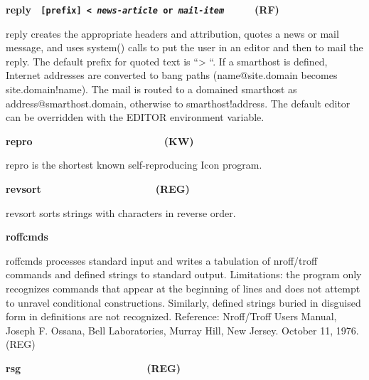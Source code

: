 {\sffamily\bfseries
reply \ \texttt{\textmd{[prefix] {\textless}
}}\texttt{\textmd{\textit{news-article}}}\texttt{\textmd{ or
}}\texttt{\textmd{\textit{mail-item\ \ \ \ \ \  }}}(RF)}

\textsf{reply} creates the appropriate headers and attribution, quotes a
news or mail message, and uses \textsf{system()} calls to put the user
in an editor and then to mail the reply. The default
prefix for quoted text is \textsf{{\textquotedblleft}{\textgreater}
{\textquotedblleft}}. If a smarthost is defined, Internet addresses are
converted to bang paths (\textsf{name@site.domain} becomes
\textsf{site.domain!name}). The mail is routed to a domained smarthost
as \textsf{address@smarthost.domain}, otherwise to
\textsf{smarthost!address}. The default editor can be overridden with
the EDITOR environment variable. 

{\sffamily\bfseries
repro\ \ \ \ \ \ \ \ \ \ \ \ \ \ \ \ \ \ \ \ \ \  \ (KW)}

\textsf{repro} is the shortest known self-reproducing Icon program. 

{\sffamily\bfseries
revsort\ \ \ \ \ \ \ \ \ \ \ \ \ \ \ \ \ \ \ \ (REG)}

\textsf{revsort} sorts strings with characters in reverse order. 

{\sffamily\bfseries
roffcmds}

\textsf{roffcmds} processes standard input and writes a tabulation of
nroff/troff commands and defined strings to standard output.
Limitations: the program only recognizes commands that appear at the
beginning of lines and does not attempt to unravel conditional
constructions. Similarly, defined strings buried in disguised form in
definitions are not recognized. Reference: Nroff/Troff
User{\textquotesingle}s Manual, Joseph F. Ossana, Bell Laboratories,
Murray Hill, New Jersey. October 11, 1976. (REG)

{\sffamily\bfseries
rsg\ \ \ \ \ \ \ \ \ \ \ \ \ \ \ \ \ \ \ \ \ \ (REG)}

